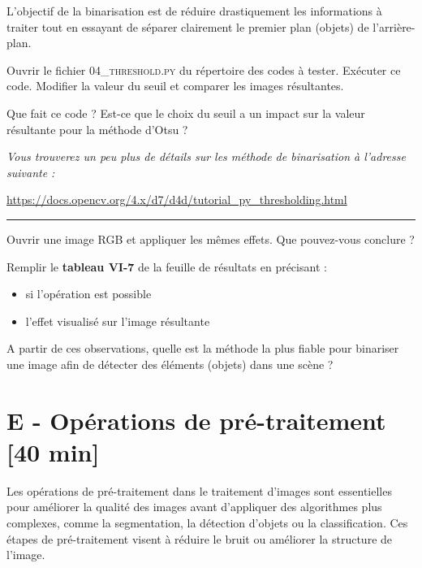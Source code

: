 L'objectif de la binarisation est de réduire drastiquement les informations à traiter tout en essayant de séparer clairement le premier plan (objets) de l'arrière-plan.

\medskip

\Manip Ouvrir le fichier \textsc{04\_threshold.py} du répertoire des codes à tester. Exécuter ce code. Modifier la valeur du seuil et comparer les images résultantes.

\Quest Que fait ce code ? Est-ce que le choix du seuil a un impact sur la valeur résultante pour la méthode d'Otsu ? 

\textit{Vous trouverez un peu plus de détails sur les méthode de binarisation à l'adresse suivante : } 

\href{https://docs.opencv.org/4.x/d7/d4d/tutorial_py_thresholding.html}{https://docs.opencv.org/4.x/d7/d4d/tutorial\_py\_thresholding.html}

\noindent \rule{\linewidth}{1pt}

\Manip Ouvrir une image RGB et appliquer les mêmes effets. Que pouvez-vous conclure ?

\Manip Remplir le \textbf{tableau VI-7} de la feuille de résultats en précisant : 
\begin{itemize}
	\item si l'opération est possible
	\item l'effet visualisé sur l'image résultante
\end{itemize}

\Quest A partir de ces observations, quelle est la méthode la plus fiable pour binariser une image afin de détecter des éléments (objets) dans une scène ?

\newpage
\section{E - Opérations de pré-traitement {[40 min]}}
Les opérations de pré-traitement dans le traitement d'images sont essentielles pour améliorer la qualité des images avant d'appliquer des algorithmes plus complexes, comme la segmentation, la détection d'objets ou la classification. Ces étapes de pré-traitement visent à réduire le bruit ou améliorer la structure de
l'image.

